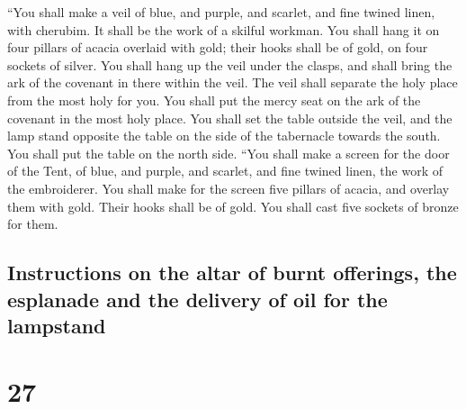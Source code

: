  ``You shall make a veil of blue, and purple, and
scarlet, and fine twined linen, with cherubim. It shall be the work of a
skilful workman.  You shall hang it on four pillars of
acacia overlaid with gold; their hooks shall be of gold, on four sockets
of silver.  You shall hang up the veil under the clasps,
and shall bring the ark of the covenant in there within the veil. The
veil shall separate the holy place from the most holy for you.
 You shall put the mercy seat on the ark of the covenant
in the most holy place.  You shall set the table outside
the veil, and the lamp stand opposite the table on the side of the
tabernacle towards the south. You shall put the table on the north side.
 ``You shall make a screen for the door of the Tent, of
blue, and purple, and scarlet, and fine twined linen, the work of the
embroiderer.  You shall make for the screen five pillars
of acacia, and overlay them with gold. Their hooks shall be of gold. You
shall cast five sockets of bronze for them.

\hypertarget{instructions-on-the-altar-of-burnt-offerings-the-esplanade-and-the-delivery-of-oil-for-the-lampstand}{%
\subsection{Instructions on the altar of burnt offerings, the esplanade
and the delivery of oil for the
lampstand}\label{instructions-on-the-altar-of-burnt-offerings-the-esplanade-and-the-delivery-of-oil-for-the-lampstand}}

\hypertarget{section-26}{%
\section{27}\label{section-26}}

